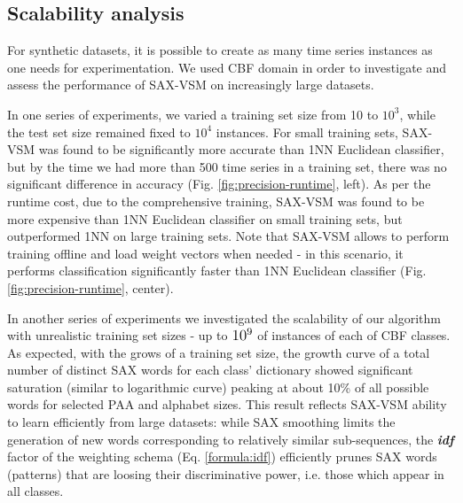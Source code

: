 \documentclass[conference]{IEEEtran}
\begin{document}
\subsection{Scalability analysis} \label{scalability}
For synthetic datasets, it is possible to create as many time series instances as 
one needs for experimentation.
We used CBF \cite{cbf} domain in order to investigate and assess the performance 
of SAX-VSM on increasingly large datasets.

In one series of experiments, we varied a training set size from 10 to $10^{3}$, while 
the test set size remained fixed to $10^{4}$ instances. 
For small training sets, SAX-VSM was found to be significantly more accurate than 
1NN Euclidean classifier, but by the time we had more than 500 time series in a training set, 
there was no significant difference in accuracy (Fig. \ref{fig:precision-runtime}, left). 
As per the runtime cost, due to the comprehensive training, SAX-VSM was found to 
be more expensive than 1NN Euclidean classifier on small training sets, 
but outperformed 1NN on large training sets. Note that SAX-VSM allows to perform training 
offline and load weight vectors when needed - in this scenario, it performs classification 
significantly faster than 1NN Euclidean classifier (Fig. \ref{fig:precision-runtime}, center).

In another series of experiments we investigated the scalability of our algorithm with
unrealistic training set sizes - up to $\normalsize{10^{9}}$ of instances of each of CBF classes.
As expected, with the grows of a training set size, the growth curve of a total number of 
distinct SAX words for each class' dictionary showed significant saturation 
(similar to logarithmic curve) peaking at about 10\% of all possible words for selected 
PAA and alphabet sizes.
This result reflects SAX-VSM ability to learn efficiently from large datasets: 
while SAX smoothing limits the generation of new words corresponding to 
relatively similar sub-sequences, the \textbf{\textit{idf}} factor of the weighting 
schema (Eq. \ref{formula:idf}) efficiently prunes SAX words (patterns) 
that are loosing their discriminative power, i.e. those which appear in all classes.

\end{document}
